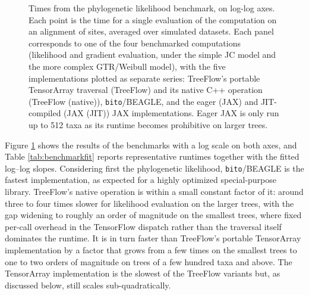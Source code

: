 \begin{figure}
    \centering
    \caption{Times from the phylogenetic likelihood benchmark, on log-log axes. Each point is the time for a single evaluation of the computation on an alignment of  sites, averaged over  simulated datasets. Each panel corresponds to one of the four benchmarked computations (likelihood and gradient evaluation, under the simple JC model and the more complex GTR/Weibull model), with the five implementations plotted as separate series: TreeFlow's portable TensorArray traversal (TreeFlow) and its native C++ operation (TreeFlow (native)), \texttt{bito}/BEAGLE, and the eager (JAX) and JIT-compiled (JAX (JIT)) JAX implementations. Eager JAX is only run up to 512 taxa as its runtime becomes prohibitive on larger trees.}
    \label{fig:benchmark}
\end{figure}

\begin{table}
    \centering
    \caption{Results of phylogenetic likelihood benchmark. Times are for a single evaluation of the computation on a 512-taxon tree with  sites, in seconds, quoted to three significant figures and averaged over  simulated datasets; slopes are fitted to log-transformed times against log-transformed taxon counts across the full range of taxon counts. Times for gradients for the GTR/Weibull are highlighted as they are the most relevant computation for gradient-based inference on real data.}
    \label{tab:benchmarkfit}
\end{table}

Figure \ref{fig:benchmark} shows the results of the benchmarks with a log scale on both axes, and Table \ref{tab:benchmarkfit} reports representative runtimes together with the fitted log--log slopes. Considering first the phylogenetic likelihood, \texttt{bito}/BEAGLE is the fastest implementation, as expected for a highly optimized special-purpose library. TreeFlow's native operation is within a small constant factor of it: around three to four times slower for likelihood evaluation on the larger trees, with the gap widening to roughly an order of magnitude on the smallest trees, where fixed per-call overhead in the TensorFlow dispatch rather than the traversal itself dominates the runtime. It is in turn faster than TreeFlow's portable TensorArray implementation by a factor that grows from a few times on the smallest trees to one to two orders of magnitude on trees of a few hundred taxa and above. The TensorArray implementation is the slowest of the TreeFlow variants but, as discussed below, still scales sub-quadratically.

